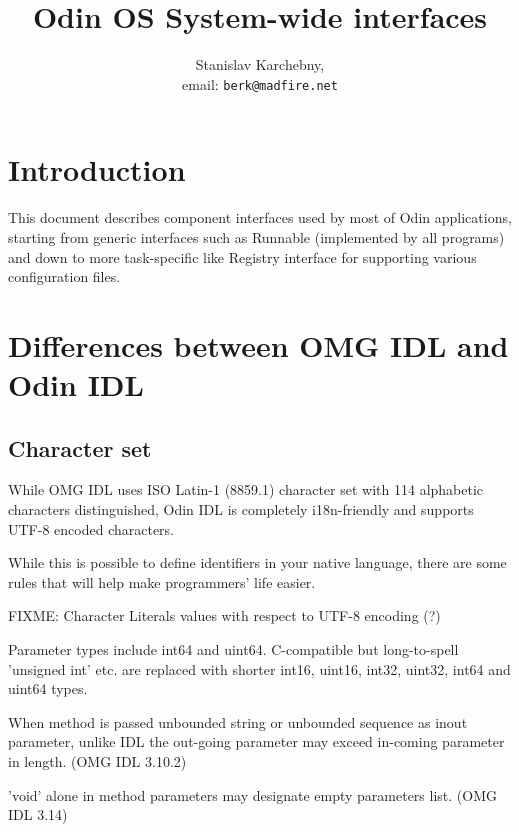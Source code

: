 \documentclass[onecolumn]{article}
\begin{document}
\title{\Large\bf Odin OS System-wide interfaces}
\author{Stanislav Karchebny, \\
        email: \texttt{berk@madfire.net}}
\maketitle

\section{Introduction}
\label{sec-intro}

\par This document describes component interfaces used by most of Odin applications, starting from
generic interfaces such as Runnable (implemented by all programs) and down to more task-specific like
Registry interface for supporting various configuration files.

\section{Differences between OMG IDL and Odin IDL}

\subsection{Character set}

\par While OMG IDL uses ISO Latin-1 (8859.1) character set with 114 alphabetic characters distinguished,
Odin IDL is completely i18n-friendly and supports UTF-8 encoded characters.

\par While this is possible to define identifiers in your native language, there are some rules that
will help make programmers' life easier.

FIXME: Character Literals values with respect to UTF-8 encoding (?)

\par Parameter types include int64 and uint64. C-compatible but long-to-spell 'unsigned int' etc. are
replaced with shorter int16, uint16, int32, uint32, int64 and uint64 types.

\par When method is passed unbounded string or unbounded sequence as inout parameter, unlike IDL the
out-going parameter may exceed in-coming parameter in length. (OMG IDL 3.10.2)

\par 'void' alone in method parameters may designate empty parameters list. (OMG IDL 3.14)
\end{document}
